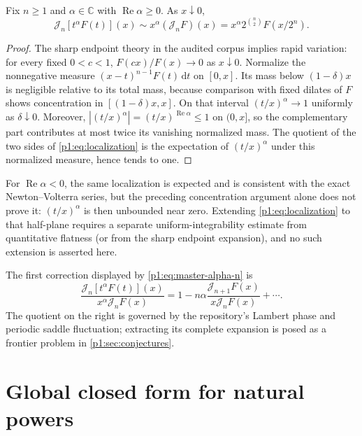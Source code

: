 \documentclass[11pt,oneside]{article}
\theoremstyle{definition}
\theoremstyle{remark}
\newcommand{\C}{\mathbb C}
\newcommand{\dd}{\,\mathrm d}
\newcommand{\Jn}{\mathcal J}
\newcommand{\1}{\mathbf 1}
\DeclareMathOperator{\Rea}{Re}
\begin{document}
\begin{corollary}\label{p1:cor:endpoint-localization}
Fix \(n\geq1\) and \(\alpha\in\C\) with \(\Rea\alpha\geq0\).  As
\(x\downarrow0\),
\begin{equation}
 \Jn_n[t^\alpha F(t)](x)
 \sim x^\alpha(\Jn_nF)(x)
 =x^\alpha2^{\binom n2}F(x/2^n).                               \label{p1:eq:localization}
\end{equation}
\end{corollary}

\begin{proof}
The sharp endpoint theory in the audited corpus implies rapid variation:
for every fixed \(0<c<1\), \(F(cx)/F(x)\to0\) as \(x\downarrow0\).  Normalize
the nonnegative measure
\((x-t)^{n-1}F(t)\dd t\) on \([0,x]\).  Its mass below \((1-\delta)x\) is
negligible relative to its total mass, because comparison with fixed dilates
of \(F\) shows concentration in \([(1-\delta)x,x]\).  On that interval
\((t/x)^\alpha\to1\) uniformly as \(\delta\downarrow0\).  Moreover,
\(|(t/x)^\alpha|=(t/x)^{\Rea\alpha}\leq1\) on \((0,x]\), so the complementary
part contributes at most twice its vanishing normalized mass.  The quotient of
the two sides of \eqref{p1:eq:localization} is the expectation of
\((t/x)^\alpha\) under this normalized measure, hence tends to one.
\end{proof}

For \(\Rea\alpha<0\), the same localization is expected and is consistent
with the exact Newton--Volterra series, but the preceding concentration
argument alone does not prove it: \((t/x)^\alpha\) is then unbounded near
zero.  Extending \eqref{p1:eq:localization} to that half-plane requires a separate
uniform-integrability estimate from quantitative flatness (or from the sharp
endpoint expansion), and no such extension is asserted here.

The first correction displayed by \eqref{p1:eq:master-alpha-n} is
\begin{equation}
 \frac{\Jn_n[t^\alpha F(t)](x)}{x^\alpha\Jn_nF(x)}
 =1-n\alpha\frac{\Jn_{n+1}F(x)}{x\Jn_nF(x)}+\cdots.             \label{p1:eq:first-local-correction}
\end{equation}
The quotient on the right is governed by the repository's Lambert phase and
periodic saddle fluctuation; extracting its complete expansion is posed as a
frontier problem in \cref{p1:sec:conjectures}.

\section{Global closed form for natural powers}
\end{document}
